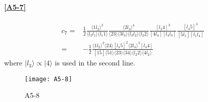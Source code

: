 \paragraph{\ref{A5-7}}
\begin{equation*}
\begin{split}
c_7 = & \frac{1}{2}\frac{\langle 1 l_2 \rangle^3}{\langle l_2 l_1 \rangle\langle l_1 1\rangle}
\frac{\langle 2 l_3 \rangle^4}{\langle 23\rangle\langle 3 l_3 \rangle\langle l_3 l_2\rangle\langle l_2 2 \rangle}
\frac{[l_3 4]^3}{[4 l_4][l_4 l_3]}
\frac{[l_4 5 ]^3}{[5 l_1 ][l_1 l_4]}
\\
= &
-\frac{1}{2}
\frac{\langle 1 l_2 \rangle^2\langle 24 \rangle [l_4 5]^2\langle 2 l_4\rangle^3 [l_4 4]}{[15]\langle 51 \rangle \langle 23 \rangle \langle 34 \rangle\langle l_2 2 \rangle\langle 4 l_2\rangle}
\end{split}
\end{equation*}
where $| l_3\rangle \propto |4\rangle$ is used in the second line.
%
%
\fi %
%
\begin{figure}
  \centering
    \texttt{[image: A5-8]}
    \caption{A5-8}
  \label{A5-8}
\end{figure}
